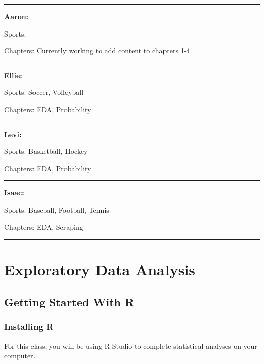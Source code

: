 \documentclass[
  11pt,
]{book}
\theoremstyle{definition}
\theoremstyle{definition}
\theoremstyle{definition}
\theoremstyle{definition}
\theoremstyle{remark}
\begin{document}
\begin{center}\rule{0.5\linewidth}{0.5pt}\end{center}

\textbf{Aaron:}

Sports:

Chapters: Currently working to add content to chapters 1-4

\begin{center}\rule{0.5\linewidth}{0.5pt}\end{center}

\textbf{Ellie:}

Sports: Soccer, Volleyball

Chapters: EDA, Probability

\begin{center}\rule{0.5\linewidth}{0.5pt}\end{center}

\textbf{Levi:}

Sports: Basketball, Hockey

Chapters: EDA, Probability

\begin{center}\rule{0.5\linewidth}{0.5pt}\end{center}

\textbf{Isaac:}

Sports: Baseball, Football, Tennis

Chapters: EDA, Scraping

\begin{center}\rule{0.5\linewidth}{0.5pt}\end{center}

\hypertarget{exploratory-data-analysis}{%
\chapter{Exploratory Data Analysis}\label{exploratory-data-analysis}}

\hypertarget{getting-started-with-r}{%
\section{Getting Started With R}\label{getting-started-with-r}}

\hypertarget{installing-r}{%
\subsection{Installing R}\label{installing-r}}

For this class, you will be using R Studio to complete statistical analyses on your computer.
\end{document}
